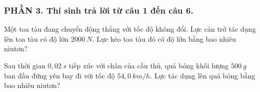 




















\subsubsection*{PHẦN 3. Thí sinh trả lời từ câu 1 đến câu 6.}
\setcounter{ex}{0} 
\begin{ex}%
Một toa tàu đang chuyển động thẳng với tốc độ không đổi. Lực cản trở tác dụng lên toa tàu có độ lớn $2000\ N$. Lực kéo toa tàu đó có độ lớn bằng bao nhiêu niutơn?
\loigiai{}
\end{ex}
\begin{ex}%
Sau thời gian $0,02\ s$ tiếp xúc với chân của cầu thủ, quả bóng khối lượng $500\ g$ ban đầu đứng yên bay đi với tốc độ $54,0\ km/h$. Lực tác dụng lên quả bóng bằng bao nhiêu niutơn?
\loigiai{}
\end{ex}


